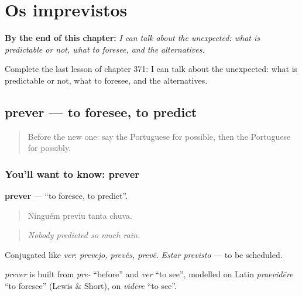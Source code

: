 
\chapter{Os imprevistos}
\label{ch:pt-os-imprevistos}

\begin{chapteropening}
\textbf{By the end of this chapter:} \emph{I can talk about the unexpected: what is predictable or not, what to foresee, and the alternatives.}

Complete the last lesson of chapter 371: I can talk about the unexpected: what is predictable or not, what to foresee, and the alternatives.
\end{chapteropening}

\section[prever]{prever — to foresee, to predict}

\label{lesson:PT-C371-prever}



\begin{quote}
Before the new one: say the Portuguese for possible, then the Portuguese for possibly.
\end{quote}

\subsection*{You'll want to know: prever}
\textbf{prever} — \textquotedblleft{}to foresee, to predict\textquotedblright{}.

\begin{quote}
Ninguém previu tanta chuva.
\end{quote}

\begin{quote}
\emph{Nobody predicted so much rain.}
\end{quote}

Conjugated like \emph{ver}: \emph{prevejo, prevês, prevê}. \emph{Estar previsto} — to be scheduled.

\begin{cousinweb}
\emph{prever} is built from \emph{pre-} \textquotedblleft{}before\textquotedblright{} and \emph{ver} \textquotedblleft{}to see\textquotedblright{}, modelled on Latin \emph{praevidēre} \textquotedblleft{}to foresee\textquotedblright{} (Lewis \& Short), on \emph{vidēre} \textquotedblleft{}to see\textquotedblright{}.
\end{cousinweb}

